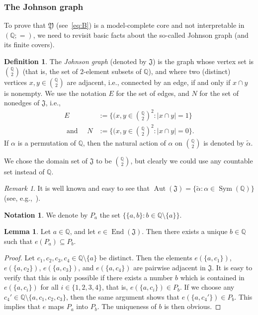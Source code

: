 \documentclass{amsart}
\theoremstyle{definition}
\newtheorem{lemma}[theorem]{Lemma}
\newtheorem{definition}[theorem]{Definition}
\newtheorem{notation}[theorem]{Notation}
\theoremstyle{remark}
\newtheorem{remark}[theorem]{Remark}
\numberwithin{equation}{section}
\newcommand{\aut}{\operatorname{Aut}}
\newcommand{\eend}{\operatorname{End}}
\newcommand{\sym}{\operatorname{Sym}}
\newcommand{\atoms}{({\mathbb Q};=)}
\newcommand{\upairs}{{{\mathbb Q}\choose 2}}
\newcommand{\john}{\mathfrak{J}}
\newcommand{\fy}{\mathfrak{Y}}
\begin{document}
\subsubsection{The Johnson graph}
To prove that $\fy$ (see~\eqref{eq:B}) is a model-complete core and not interpretable in $\atoms$, we need to revisit basic facts about the so-called Johnson graph (and its finite covers).

\begin{definition}\label{def:Johnson}
	The \emph{Johnson graph} (denoted by $\john$) is the graph whose vertex set is $\upairs$ (that is, the set of $2$-element subsets of ${\mathbb Q}$), and where two (distinct) vertices $x,y\in \upairs$ are adjacent, i.e., connected by an edge, if and only if $x\cap y$ is nonempty.
	We use the notation $E$ for the set of edges, and $N$ for the set of nonedges of $\john$, i.e., 
    \begin{align*}
        E & :=\{(x,y\in \upairs^2: |x\cap y|=1\} \\
        \text{ and } \quad N & :=\{(x,y\in \upairs^2: |x\cap y|=0\}.
        \end{align*}
	If $\alpha$ is a permutation of ${\mathbb Q}$, then the natural action of $\alpha$ on $\upairs$ is denoted  by $\tilde{\alpha}$. 
\end{definition}

	We chose the domain set of $\john$ to be $\upairs$, but clearly we could use any countable set instead of $\mathbb Q$. 

\begin{remark}\label{rem:Jaut}
	It is well known and easy to see that 
    $\aut(\john)=\{\tilde{\alpha}: \alpha\in \sym(\mathbb {Q})\}$ (see, e.g.,~\cite{bodirsky2025structures}). 
\end{remark}

\begin{notation}
	We denote by $P_a$ the set $\big \{\{a,b\}: b\in {\mathbb{Q}} \setminus \{a\} \big \}$.
\end{notation}

\begin{lemma}\label{stars}
	Let $a\in {\mathbb Q}$, and let $e\in \eend(\john)$. Then there exists a unique $b\in {\mathbb Q}$ such that $e(P_a)\subseteq P_b$.
\end{lemma}

\begin{proof}
	Let $c_1,c_2,c_3,c_4\in {\mathbb Q}\setminus \{a\}$ be distinct. Then the elements $e(\{a,c_1\})$, $e(\{a,c_2\})$, $e(\{a,c_3\})$, and $e(\{a,c_4\})$ are pairwise adjacent in $\john$. It is easy to verify that this is only possible if there exists a number $b$ which is contained in $e(\{a,c_i\})$ for all $i \in \{1,2,3,4\}$, that is, $e(\{a,c_i\})\in P_b$. If we choose any $c_4'\in {\mathbb Q}
    \setminus \{a,c_1,c_2,c_3\}$, then the same argument shows that $e(\{a,c_4'\})\in P_b$.
    This implies that $e$ maps $P_a$ into $P_b$. The uniqueness of $b$ is {then} obvious.
\end{proof}
\end{document}
